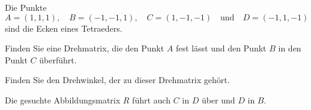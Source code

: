 Die Punkte
\[
A=( 1, 1, 1),\quad
B=(-1,-1, 1),\quad
C=( 1,-1,-1)
\quad\text{und}\quad
D=(-1, 1,-1)
\]
sind die Ecken eines Tetraeders.
\begin{center}
\end{center}
\begin{teilaufgaben}
\item
Finden Sie eine Drehmatrix, die den Punkt $A$ fest lässt und den
Punkt $B$ in den Punkt $C$ überführt.
\item
Finden Sie den Drehwinkel, der zu dieser Drehmatrix gehört.
\end{teilaufgaben}


\begin{hinweis}
Die gesuchte Abbildungsmatrix $R$ führt auch $C$ in $D$ über und $D$ in $B$.
\end{hinweis}

